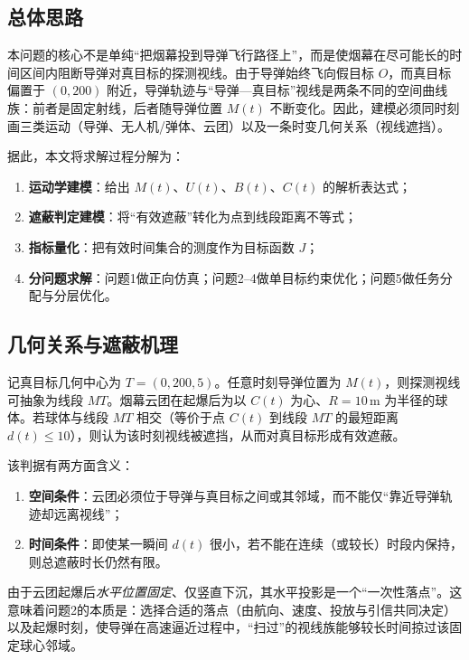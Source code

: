 \documentclass[withoutpreface,bwprint]{cumcmthesis}
\begin{document}
\subsection{总体思路}
本问题的核心不是单纯“把烟幕投到导弹飞行路径上”，而是使烟幕在尽可能长的时间区间内阻断导弹对真目标的探测视线。由于导弹始终飞向假目标 $O$，而真目标偏置于 $(0,200)$ 附近，导弹轨迹与“导弹—真目标”视线是两条不同的空间曲线族：前者是固定射线，后者随导弹位置 $M(t)$ 不断变化。因此，建模必须同时刻画三类运动（导弹、无人机/弹体、云团）以及一条时变几何关系（视线遮挡）。

据此，本文将求解过程分解为：
\begin{enumerate}
  \item \textbf{运动学建模}：给出 $M(t)$、$U(t)$、$B(t)$、$C(t)$ 的解析表达式；
  \item \textbf{遮蔽判定建模}：将“有效遮蔽”转化为点到线段距离不等式；
  \item \textbf{指标量化}：把有效时间集合的测度作为目标函数 $J$；
  \item \textbf{分问题求解}：问题1做正向仿真；问题2–4做单目标约束优化；问题5做任务分配与分层优化。
\end{enumerate}

\subsection{几何关系与遮蔽机理}
记真目标几何中心为 $T=(0,200,5)$。任意时刻导弹位置为 $M(t)$，则探测视线可抽象为线段 $MT$。烟幕云团在起爆后为以 $C(t)$ 为心、$R=10\,\mathrm{m}$ 为半径的球体。若球体与线段 $MT$ 相交（等价于点 $C(t)$ 到线段 $MT$ 的最短距离 $d(t)\le 10$），则认为该时刻视线被遮挡，从而对真目标形成有效遮蔽。

该判据有两方面含义：
\begin{enumerate}
  \item \textbf{空间条件}：云团必须位于导弹与真目标之间或其邻域，而不能仅“靠近导弹轨迹却远离视线”；
  \item \textbf{时间条件}：即使某一瞬间 $d(t)$ 很小，若不能在连续（或较长）时段内保持，则总遮蔽时长仍然有限。
\end{enumerate}

由于云团起爆后\emph{水平位置固定}、仅竖直下沉，其水平投影是一个“一次性落点”。这意味着问题2的本质是：选择合适的落点（由航向、速度、投放与引信共同决定）以及起爆时刻，使导弹在高速逼近过程中，“扫过”的视线族能够较长时间掠过该固定球心邻域。
\end{document}
